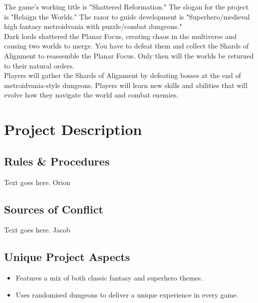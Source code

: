 \documentclass[titlepage]{article}
\begin{document}
%

The game's working title is "Shattered Reformation." The slogan for the project
is "Relaign the Worlds." The razor to guide development is "Superhero/medieval
high fantasy metroidvania with puzzle/combat dungeons." \\

Dark lords shattered the Planar Focus, creating chaos in the multiverse and
causing two worlds to merge. You have to defeat them and collect the Shards of
Alignment to reassemble the Planar Focus. Only then will the worlds be returned
to their natural orders. \\

Players will gather the Shards of Alignment by defeating bosses at the end of
metroidvania-style dungeons. Players will learn new skills and abilities that
will evolve how they navigate the world and combat enemies. 

\section{Project Description}

\subsection{Rules \& Procedures}
Text goes here. Orion

\subsection{Sources of Conflict}
Text goes here. Jacob

\subsection{Unique Project Aspects}
\begin{itemize}
	\item Features a mix of both classic fantasy and superhero themes.
	\item Uses randomised dungeons to deliver a unique experience in every game.
\end{itemize}
\end{document}
